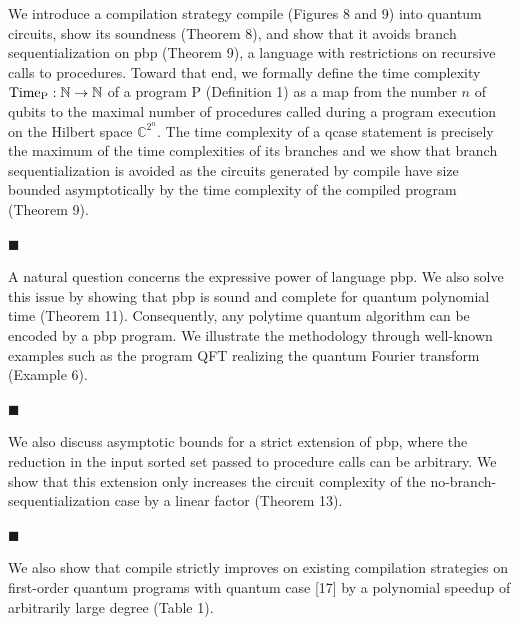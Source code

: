 \documentclass[10pt,a4paper]{amsart}
\begin{document}
We introduce a compilation strategy compile (Figures 8 and 9) into quantum circuits, show its soundness (Theorem 8), and show that it avoids branch sequentialization on pbp (Theorem 9), a language with restrictions on recursive calls to procedures. Toward that end, we formally define the time complexity $\textnormal{Time}_{\mathrm{P}}:\mathbb{N}\to\mathbb{N}$ of a program $\mathrm{P}$ (Definition 1) as a map from the number $n$ of qubits to the maximal number of procedures called during a program execution on the Hilbert space $\mathbb{C}^{2^{n}}$. The time complexity of a qcase statement is precisely the maximum of the time complexities of its branches and we show that branch sequentialization is avoided as the circuits generated by compile have size bounded asymptotically by the time complexity of the compiled program (Theorem 9).\par
 
 
 
\par\noindent  $\blacksquare$ 
 
A natural question concerns the expressive power of language pbp. We also solve this issue by showing that pbp is sound and complete for quantum polynomial time (Theorem 11). Consequently, any polytime quantum algorithm can be encoded by a pbp program. We illustrate the methodology through well-known examples such as the program QFT realizing the quantum Fourier transform (Example 6).\par
 
 
 
\par\noindent  $\blacksquare$ 
 
We also discuss asymptotic bounds for a strict extension of pbp, where the reduction in the input sorted set passed to procedure calls can be arbitrary. We show that this extension only increases the circuit complexity of the no-branch-sequentialization case by a linear factor (Theorem 13).\par
 
 
 
\par\noindent  $\blacksquare$ 
 
We also show that compile strictly improves on existing compilation strategies on first-order quantum programs with quantum case [17] by a polynomial speedup of arbitrarily large degree (Table 1).\par
 
\end{document}
